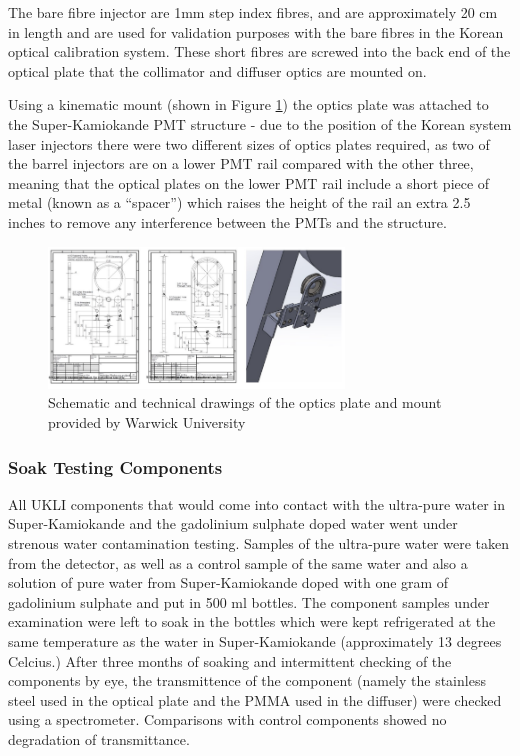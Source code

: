 The bare fibre injector are 1mm step index fibres, and are approximately 20 cm in length and are used for validation purposes with the bare fibres in the Korean optical calibration system. These short fibres are screwed into the back end of the optical plate that the collimator and diffuser optics are mounted on.

Using a kinematic mount (shown in Figure \ref{fig:mount}) the optics plate was attached to the Super-Kamiokande PMT structure - due to the position of the Korean system laser injectors there were two different sizes of optics plates required, as two of the barrel injectors are on a lower PMT rail compared with the other three, meaning that the optical plates on the lower PMT rail include a short piece of metal (known as a ``spacer'') which raises the height of the rail an extra 2.5 inches to remove any interference between the PMTs and the structure.

\begin{figure}
    \centering
    \includegraphics[width=0.7\textwidth]{Figures/mount.png}
    \caption{Schematic and technical drawings of the optics plate and mount provided by Warwick University}
    \label{fig:mount}
\end{figure}


\subsubsection{Soak Testing Components}

All UKLI components that would come into contact with the ultra-pure water in Super-Kamiokande and the gadolinium sulphate doped water went under strenous water contamination testing. Samples of the ultra-pure water were taken from the detector, as well as a control sample of the same water and also a solution of pure water from Super-Kamiokande doped with one gram of gadolinium sulphate and put in 500 ml bottles. The component samples under examination were left to soak in the bottles which were kept refrigerated at the same temperature as the water in Super-Kamiokande (approximately 13 degrees Celcius.) After three months of soaking and intermittent checking of the components by eye, the transmittence of the component (namely the stainless steel used in the optical plate and the PMMA used in the diffuser) were checked using a spectrometer. Comparisons with control components showed no degradation of transmittance. 

